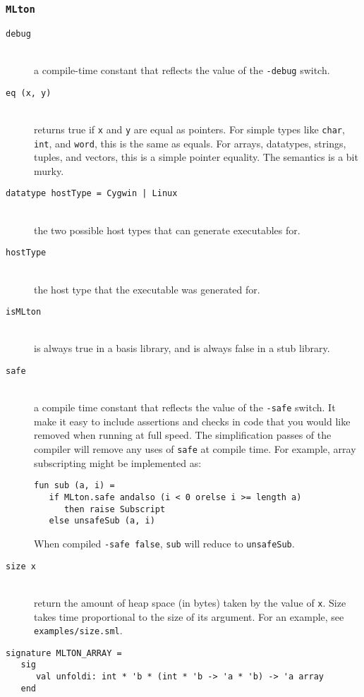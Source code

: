 \subsubsection{{\tt MLton}}

\newcommand{\entry}[1]{\item[\tt #1]\hspace{1in}\\}
\begin{description}

\entry{debug}
a compile-time constant that reflects the value of the {\tt -debug} switch.

\entry{eq (x, y)}
returns true if {\tt x} and {\tt y} are equal as pointers.  For simple types
like {\tt char}, {\tt int}, and {\tt word}, this is the same as equals.  For
arrays, datatypes, strings, tuples, and vectors, this is a simple pointer
equality.  The semantics is a bit murky.

\entry{datatype hostType = Cygwin | Linux}
the two possible host types that {\mlton} can generate executables for.

\entry{hostType}
the host type that the executable was generated for.

\entry{isMLton}
is always true in a {\mlton} basis library, and is always false in a stub
library.

\entry{safe}
a compile time constant that reflects the value of the {\tt -safe} switch.  It
make it easy to include assertions and checks in code that you would like
removed when running at full speed. The simplification passes of the compiler
will remove any uses of {\tt safe} at compile time.  For example, array
subscripting might be implemented as:
\begin{verbatim}
fun sub (a, i) =
   if MLton.safe andalso (i < 0 orelse i >= length a)
      then raise Subscript
   else unsafeSub (a, i)
\end{verbatim}
When compiled {\tt -safe false}, {\tt sub} will reduce to
{\tt unsafeSub}.

\entry{size x}
return the amount of heap space (in bytes) taken by the value of {\tt x}.  Size
takes time proportional to the size of its argument.  For an example, see {\tt
examples/size.sml}.

\end{description}

\begin{verbatim}
signature MLTON_ARRAY =
   sig
      val unfoldi: int * 'b * (int * 'b -> 'a * 'b) -> 'a array
   end
\end{verbatim}

